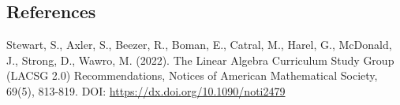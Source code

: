 \documentclass{ximera}
\begin{document}



\subsection{References}

Stewart, S., Axler, S., Beezer, R., Boman, E., Catral, M., Harel, G., McDonald, J., Strong, D., Wawro, M. (2022). The Linear Algebra Curriculum Study Group (LACSG 2.0) Recommendations, Notices of American Mathematical Society, 69(5), 813-819. DOI: \href{https://dx.doi.org/10.1090/noti2479}{https://dx.doi.org/10.1090/noti2479}
\end{document}
